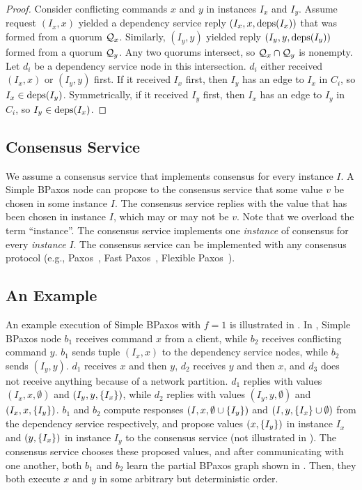 \begin{proof}
  Consider conflicting commands $x$ and $y$ in instances $I_x$ and $I_y$.
  Assume request $(I_x, x)$ yielded a dependency service reply $(I_x, x,
  \text{deps}(I_x))$ that was formed from a quorum $\mathcal{Q}_x$. Similarly, $(I_y, y)$
  yielded reply $(I_y, y, \text{deps}(I_y))$ formed from a quorum $\mathcal{Q}_y$. Any two
  quorums intersect, so $\mathcal{Q}_x \cap \mathcal{Q}_y$ is nonempty. Let $d_i$ be a
  dependency service node in this intersection. $d_i$ either received $(I_x,
  x)$ or $(I_y, y)$ first. If it received $I_x$ first, then $I_y$ has an edge
  to $I_x$ in $C_i$, so $I_x \in \text{deps}(I_y)$.  Symmetrically, if it received
  $I_y$ first, then $I_x$ has an edge to $I_y$ in $C_i$, so $I_y \in
  \text{deps}(I_x)$.
\end{proof}

\subsection{Consensus Service}
We assume a consensus service that implements consensus for every instance $I$.
A Simple BPaxos node can propose to the consensus service that some value $v$
be chosen in some instance $I$. The consensus service replies with the value
that has been chosen in instance $I$, which may or may not be $v$. Note that we
overload the term ``instance''. The consensus service implements one
\emph{instance} of consensus for every \emph{instance} $I$. The consensus
service can be implemented with any consensus protocol (e.g.,
Paxos~\cite{lamport1998part, lamport2001paxos}, Fast
Paxos~\cite{lamport2006fast}, Flexible Paxos~\cite{howard2016flexible}).

\subsection{An Example}


An example execution of Simple BPaxos with $f=1$ is illustrated in
. In , Simple BPaxos
node $b_1$ receives command $x$ from a client, while $b_2$ receives conflicting
command $y$. $b_1$ sends tuple $(I_x, x)$ to the dependency service nodes,
while $b_2$ sends $(I_y, y)$. $d_1$ receives $x$ and then $y$, $d_2$ receives
$y$ and then $x$, and $d_3$ does not receive anything because of a network
partition. $d_1$ replies with values $(I_x, x, \emptyset)$ and $(I_y, y,
\{I_x\})$, while $d_2$ replies with values $(I_y, y, \emptyset)$ and $(I_x,
x, \{I_y\})$.  $b_1$ and $b_2$ compute responses $(I, x, \emptyset{} \cup
\{I_y\})$ and $(I, y, \{I_x\} \cup \emptyset{})$ from the dependency
service respectively, and propose values $(x, \{I_y\})$ in instance $I_x$ and
$(y, \{I_x\})$ in instance $I_y$ to the consensus service (not illustrated in
). The consensus service chooses these proposed
values, and after communicating with one another, both $b_1$ and $b_2$ learn
the partial BPaxos graph shown in . Then, they
both execute $x$ and $y$ in some arbitrary but deterministic order.

